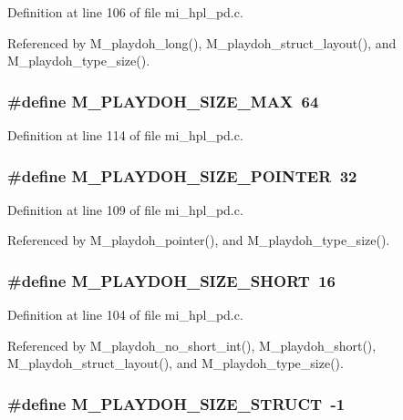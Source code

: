 Definition at line 106 of file mi\_\-hpl\_\-pd.c.

Referenced by M\_\-playdoh\_\-long(), M\_\-playdoh\_\-struct\_\-layout(), and M\_\-playdoh\_\-type\_\-size().
\subsubsection{\setlength{\rightskip}{0pt plus 5cm}\#define M\_\-PLAYDOH\_\-SIZE\_\-MAX~64}\label{mi__hpl__pd_8c_b8761d0eec5d112545a0bc5aec238bb3}




Definition at line 114 of file mi\_\-hpl\_\-pd.c.
\subsubsection{\setlength{\rightskip}{0pt plus 5cm}\#define M\_\-PLAYDOH\_\-SIZE\_\-POINTER~32}\label{mi__hpl__pd_8c_16d9bf9e7917f54f1cba52aba6af93e7}




Definition at line 109 of file mi\_\-hpl\_\-pd.c.

Referenced by M\_\-playdoh\_\-pointer(), and M\_\-playdoh\_\-type\_\-size().
\subsubsection{\setlength{\rightskip}{0pt plus 5cm}\#define M\_\-PLAYDOH\_\-SIZE\_\-SHORT~16}\label{mi__hpl__pd_8c_cbd04f1e0b37db2d0093d8da516f81a2}




Definition at line 104 of file mi\_\-hpl\_\-pd.c.

Referenced by M\_\-playdoh\_\-no\_\-short\_\-int(), M\_\-playdoh\_\-short(), M\_\-playdoh\_\-struct\_\-layout(), and M\_\-playdoh\_\-type\_\-size().
\subsubsection{\setlength{\rightskip}{0pt plus 5cm}\#define M\_\-PLAYDOH\_\-SIZE\_\-STRUCT~-1}\label{mi__hpl__pd_8c_723f3c1187168c978dc8fff144ae2c32}





